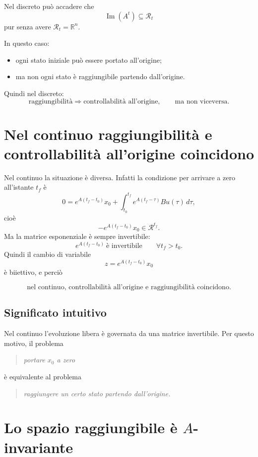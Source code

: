 Nel discreto può accadere che
\[
\operatorname{Im}(A^t)\subseteq \mathcal{R}_t
\]
pur senza avere \(\mathcal{R}_t=\mathbb{R}^n\).

In questo caso:
\begin{itemize}
    \item ogni stato iniziale può essere portato all’origine;
    \item ma non ogni stato è raggiungibile partendo dall’origine.
\end{itemize}

Quindi nel discreto:
\begin{equation}
\boxed{
\text{raggiungibilità} \Longrightarrow \text{controllabilità all'origine},
\qquad
\text{ma non viceversa.}
}
\label{eq:L11_no_equiv_td}
\end{equation}

\section{Nel continuo raggiungibilità e controllabilità all'origine coincidono}

Nel continuo la situazione è diversa.  
Infatti la condizione per arrivare a zero all’istante \(t_f\) è
\[
0=e^{A(t_f-t_0)}x_0+\int_{t_0}^{t_f} e^{A(t_f-\tau)}Bu(\tau)\,d\tau,
\]
cioè
\[
-e^{A(t_f-t_0)}x_0\in \mathcal{R}^{t_f}.
\]
Ma la matrice esponenziale è sempre invertibile:
\[
e^{A(t_f-t_0)} \ \text{è invertibile}\qquad \forall t_f>t_0.
\]
Quindi il cambio di variabile
\[
z=e^{A(t_f-t_0)}x_0
\]
è biiettivo, e perciò

\begin{equation}
\boxed{
\text{nel continuo, controllabilità all'origine e raggiungibilità coincidono.}
}
\label{eq:L11_equiv_tc}
\end{equation}

\subsection{Significato intuitivo}

Nel continuo l’evoluzione libera è governata da una matrice invertibile.  
Per questo motivo, il problema
\begin{quote}
\emph{portare \(x_0\) a zero}
\end{quote}
è equivalente al problema
\begin{quote}
\emph{raggiungere un certo stato partendo dall’origine.}
\end{quote}

\section{Lo spazio raggiungibile è \(A\)-invariante}


